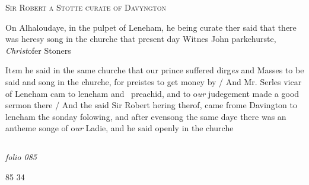 \documentclass[12pt, a4paper]{book}
\begin{document}
            
            	
				\begin{center} \begin{large} {\scshape Sir Robert a Stotte curate
 of Davyngton} \end{large} \end{center}
			

	
		
				\marginpar[\vspace{0.5cm}{\textcolor{Gray}{1541}}]{}
			
            		
				\marginpar[\vspace{0.5cm}{\textcolor{Gray}{offensive n}}]{}
			
            		
		\ifthenelse{\isodd{\thepage}}
		{\reversemarginpar}
		{\normalmarginpar}
		On Alhaloudaye, in the pulpet of Leneham, he being curate ther
  said that there was heresy song in the churche that present day
  Witnes John parkehurste, \textit{Christ}ofer Stoners
	
 
 	
				\marginpar[\vspace{0.5cm}{\textcolor{Gray}{seditious}}]{}
			
            	
		\ifthenelse{\isodd{\thepage}}
		{\reversemarginpar}
		{\normalmarginpar}
		It\textit{e}m he said in the same churche that our prince suffered dirg\textit{es} and
 Masses to be said and song in the churche, for preistes to get money
 by / And Mr. Serles vicar of Leneham cam to leneham and 
 preachid, and to o\textit{ur} judegement made a good sermon there / And the
            		said Sir Robert hering therof, came frome Davington to leneham
 the sonday folowing, and after evensong the same daye there
 was an antheme songe of o\textit{ur} Ladie, and he said openly in the churche


\dotfill
						\newpage {} \subsection*{}  \subsection*{}

\textit{folio 085}


\begin{flushright}{\color{Mahogany}85} 34\end{flushright}
\end{document}
